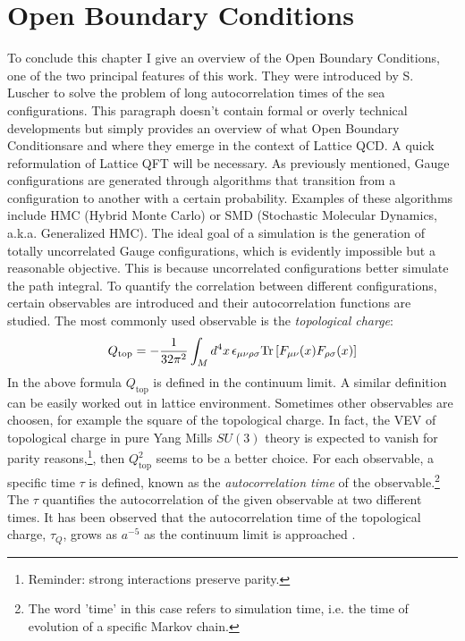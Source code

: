 \documentclass[english, LaM, oneside, noexaminfo]{sapthesis}
\newcommand{\obc}{Open Boundary Conditions}
\newcommand{\tr}{\text{Tr}}
\begin{document}
\section{\obc}
\noindent
To conclude this chapter I give an overview of the \obc, one of the two principal features of this work.
They were introduced by S. Luscher \cite{OBC_top} to solve the problem of long autocorrelation times of the sea configurations.
This paragraph doesn't contain formal or overly technical developments but simply provides an overview of what \obc\space are and where they emerge in the context of Lattice QCD.
A quick reformulation of Lattice QFT will be necessary.
\newline
As previously mentioned, Gauge configurations are generated through algorithms that transition from a configuration to another with a certain probability.
Examples of these algorithms include HMC (Hybrid Monte Carlo) or SMD (Stochastic Molecular Dynamics, a.k.a. Generalized HMC).
The ideal goal of a simulation is the generation of totally uncorrelated Gauge configurations, which is evidently impossible but a reasonable objective.
This is because uncorrelated configurations better simulate the path integral.
To quantify the correlation between different configurations, certain observables are introduced and their autocorrelation functions are studied.
The most commonly used observable is the {\it topological charge}:
\begin{equation*}
    Q_\text{top} = -\frac{1}{32\pi^2}\int_M d^4x \hspace*{.5mm} \epsilon_{\mu\nu\rho\sigma} \tr \left[F_{\mu\nu}(x) F_{\rho\sigma}(x)\right]
\end{equation*}
In the above formula $Q_\text{top}$ is defined in the continuum limit.
A similar definition can be easily worked out in lattice environment.
Sometimes other observables are choosen, for example the square of the topological charge.
In fact, the VEV of topological charge in pure Yang Mills $SU(3)$ theory is expected to vanish for parity reasons,\footnote{Reminder: strong interactions preserve parity.}, then $Q_\text{top}^2$ seems to be a better choice.
For each observable, a specific time $\tau$ is defined, known as the {\it autocorrelation time} of the observable.\footnote{The word 'time' in this case refers to simulation time, i.e. the time of evolution of a specific Markov chain.}
The $\tau$ quantifies the autocorrelation of the given observable at two different times.
It has been observed that the autocorrelation time of the topological charge, $\tau_Q$, grows as $a^{-5}$ as the continuum limit is approached \cite{Topology-WilsonFlow-HMC}.
\end{document}
